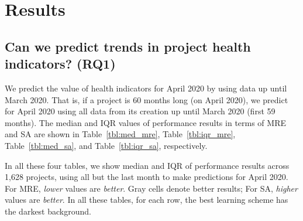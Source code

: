 \documentclass[sigconf,review,anonymous]{acmart}
\newcommand{\bi}{\begin{itemize}}
\newcommand{\ei}{\end{itemize}}
\begin{document}
\section{Results}
\label{sect:resul} 
\subsection{Can we predict trends in project health indicators? (RQ1)}






We predict the value of health indicators for April 2020 by using data up until March 2020. That is, if a project is 60 months long (on April 2020), we predict for April 2020 using all data from its creation up until March 2020 (first 59 months). The median and IQR values of performance results in terms of MRE and SA are shown in Table~\ref{tbl:med_mre}, Table~\ref{tbl:iqr_mre},  Table~\ref{tbl:med_sa}, and Table~\ref{tbl:iqr_sa}, respectively.

In all these four tables, we show median  and IQR of performance results across 1,628 projects,  using all but the last month to make predictions for  April 2020. For MRE, {\em lower} values are {\em better}. Gray cells denote better results; For SA, {\em higher} values are {\em better}. In all these tables, for each row, the best learning scheme has the darkest background.
\end{document}
